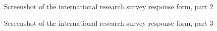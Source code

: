 \begin{figure}[H]
    \centering
    \caption{Screenshot of the international research survey response form, part 2}
    \label{fig:s2}
\end{figure}

\begin{figure}[H]
    \centering
    \caption{Screenshot of the international research survey response form, part 3}
    \label{fig:s3}
\end{figure}

